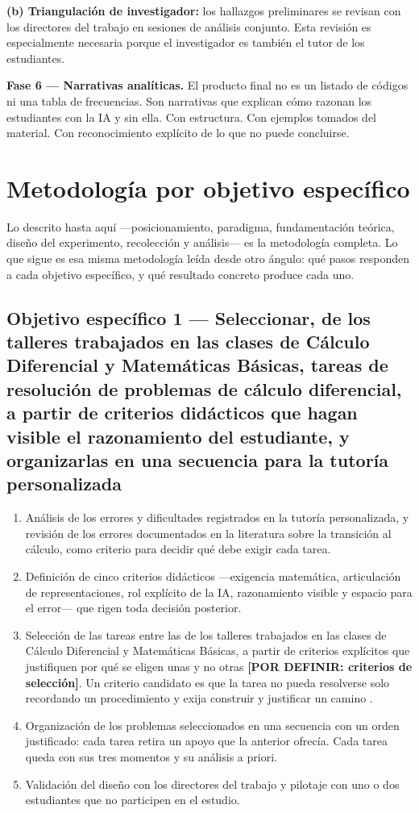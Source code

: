 \textbf{(b) Triangulación de investigador:} los hallazgos preliminares se revisan con los directores del trabajo en sesiones de análisis conjunto. Esta revisión es especialmente necesaria porque el investigador es también el tutor de los estudiantes.

\textbf{Fase 6 --- Narrativas analíticas.} El producto final no es un listado de códigos ni una tabla de frecuencias. Son narrativas que explican cómo razonan los estudiantes con la IA y sin ella. Con estructura. Con ejemplos tomados del material. Con reconocimiento explícito de lo que no puede concluirse.

\section{Metodología por objetivo específico}
\label{sec:metodologia_por_objetivo}

Lo descrito hasta aquí ---posicionamiento, paradigma, fundamentación teórica, diseño del experimento, recolección y análisis--- es la metodología completa. Lo que sigue es esa misma metodología leída desde otro ángulo: qué pasos responden a cada objetivo específico, y qué resultado concreto produce cada uno.

\subsection*{Objetivo específico 1 --- Seleccionar, de los talleres trabajados en las clases de Cálculo Diferencial y Matemáticas Básicas, tareas de resolución de problemas de cálculo diferencial, a partir de criterios didácticos que hagan visible el razonamiento del estudiante, y organizarlas en una secuencia para la tutoría personalizada}

\begin{enumerate}
  \item Análisis de los errores y dificultades registrados en la tutoría personalizada, y revisión de los errores documentados en la literatura sobre la transición al cálculo, como criterio para decidir qué debe exigir cada tarea.
  \item Definición de cinco criterios didácticos ---exigencia matemática, articulación de representaciones, rol explícito de la IA, razonamiento visible y espacio para el error--- que rigen toda decisión posterior.
  \item Selección de las tareas entre las de los talleres trabajados en las clases de Cálculo Diferencial y Matemáticas Básicas, a partir de criterios explícitos que justifiquen por qué se eligen unas y no otras \textbf{[POR DEFINIR: criterios de selección]}. Un criterio candidato es que la tarea no pueda resolverse solo recordando un procedimiento y exija construir y justificar un camino \parencite{lithner2008framework}.
  \item Organización de los problemas seleccionados en una secuencia con un orden justificado: cada tarea retira un apoyo que la anterior ofrecía. Cada tarea queda con sus tres momentos y su análisis a priori.
  \item Validación del diseño con los directores del trabajo y pilotaje con uno o dos estudiantes que no participen en el estudio.
\end{enumerate}

